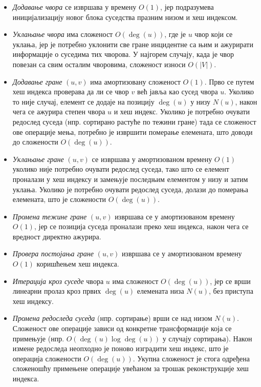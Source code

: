\begin{itemize}
    \item \textit{Додавање чвора} се извршава у времену $O(1)$, јер подразумева иницијализацију новог блока суседства празним низом и хеш индексом.

    \item \textit{Уклањање чвора} има сложеност $O(\deg(u))$, где је $u$ чвор који се уклања, јер је потребно уклонити све гране инцидентне са њим и ажурирати информације о суседима тих чворова. У најгорем случају, када је чвор повезан са свим осталим чворовима, сложеност износи $O(|V|)$.

    \item \textit{Додавање гране} $(u, v)$ има амортизовану сложеност $O(1)$. Прво се путем хеш индекса проверава да ли се чвор $v$ већ јавља као сусед чвора $u$. Уколико то није случај, елемент се додаје на позицију $\deg(u)$ у низу $N(u)$, након чега се ажурира степен чвора $u$ и хеш индекс.  
    Уколико је потребно очувати редослед суседа (нпр. сортирано растуће по тежини гране) тада се сложеност ове операције мења, потребно је извршити померање елемената, што доводи до сложености $O(\deg(u))$.

    \item \textit{Уклањање гране} $(u, v)$ се извршава у амортизованом времену $O(1)$ уколико није потребно очувати редослед суседа, тако што се елемент проналази у хеш индексу и замењује последњим елементом у низу и затим уклања.  
    Уколико је потребно очувати редослед суседа, долази до померања елемената, што је сложености $O(\deg(u))$.

    \item \textit{Промена тежине гране} $(u, v)$ извршава се у амортизованом времену $O(1)$, јер се позиција суседа проналази преко хеш индекса, након чега се вредност директно ажурира.

    \item \textit{Провера постојања гране} $(u, v)$ извршава се у амортизованом времену $O(1)$ коришћењем хеш индекса.

    \item \textit{Итерација кроз суседе} чвора $u$ има сложеност $O(\deg(u))$, јер се врши линеарни пролаз кроз првих $\deg(u)$ елемената низа $N(u)$, без приступа хеш индексу.

    \item \textit{Промена редоследа суседа} (нпр. сортирање) врши се над низом $N(u)$. Сложеност ове операције зависи од конкретне трансформације која се примењује (нпр. $O(\deg(u)\log \deg(u))$ у случају сортирања). Након измене редоследа неопходно је поново изградити хеш индекс, што је операција сложености $O(\deg(u))$. Укупна сложеност је стога одређена сложеношћу примењене операције увећаном за трошак реконструкције хеш индекса.
\end{itemize}

